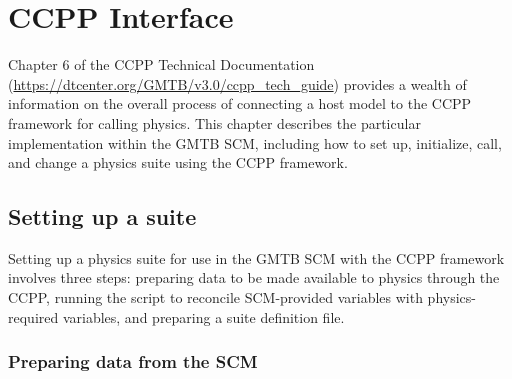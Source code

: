 \chapter{CCPP Interface}
\label{chapter: ccpp_interface}

Chapter 6 of the CCPP Technical Documentation (\url{https://dtcenter.org/GMTB/v3.0/ccpp\_tech\_guide}) provides a wealth of information on the overall process of connecting a host model to the CCPP framework for calling physics. This chapter describes the particular implementation within the GMTB SCM, including how to set up, initialize, call, and change a physics suite using the CCPP framework.

\section{Setting up a suite}

Setting up a physics suite for use in the GMTB SCM with the CCPP framework involves three steps: preparing data to be made available to physics through the CCPP, running the  script to reconcile SCM-provided variables with physics-required variables, and preparing a suite definition file.

\subsection{Preparing data from the SCM}

